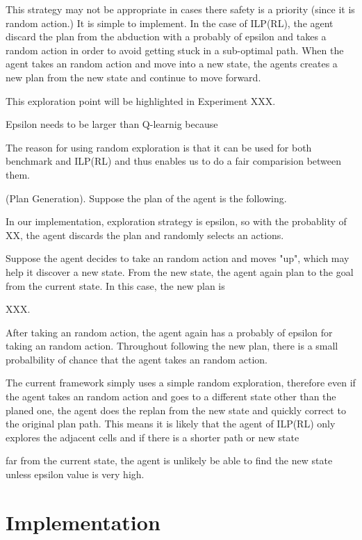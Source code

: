 This strategy may not be appropriate in cases there safety is a priority (since it is random action.)
It is simple to implement.
In the case of ILP(RL), the agent discard the plan from the abduction with a probably of epsilon and takes a random action in order to avoid getting stuck in a sub-optimal path.
When the agent takes an random action and move into a new state, the agents creates a new plan from the new state and continue to move forward.



This exploration point will be highlighted in Experiment XXX.

Epsilon needs to be larger than Q-learnig because

The reason for using random exploration is that it can be used for both benchmark and ILP(RL) and thus enables us to do a fair comparision between them.

\begin{examp} \normalfont (Plan Generation).
Suppose the plan of the agent is the following. 

In our implementation, exploration strategy is epsilon, so with the probablity of XX, the agent discards the plan and randomly selects an actions. 

Suppose the agent decides to take an random action and moves "up", which may help it discover a new state. 
From the new state, the agent again plan to the goal from the current state. In this case, the new plan is 

XXX. 

After taking an random action, the agent again has a probably of epsilon for taking an random action. 
Throughout following the new plan, there is a small probalbility of chance that the agent takes an random action.

\end{examp}
    
The current framework simply uses a simple random exploration, therefore even if the agent takes an random action and goes to a different state other than the planed one, 
the agent does the replan from the new state and quickly correct to the original plan path. This means it is likely that the agent of ILP(RL) only explores the adjacent cells and if there is a shorter path or new state

far from the current state, the agent is unlikely be able to find the new state unless epsilon value is very high. 


\section{Implementation}
\label{Implementation}

